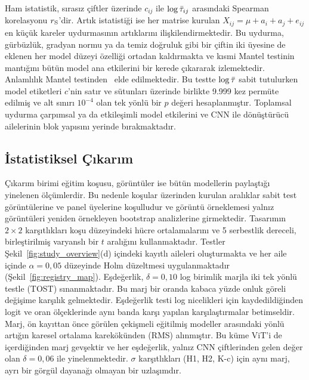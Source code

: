 Ham istatistik, sırasız çiftler üzerinde $c_{ij}$ ile $\log\bar{\tau}_{ij}$ arasındaki Spearman korelasyonu $r_{\mathrm{S}}$'dir. Artık istatistiği ise her matrise kurulan $X_{ij} = \mu + a_i + a_j + e_{ij}$ en küçük kareler uydurmasının artıklarını ilişkilendirmektedir. Bu uydurma, gürbüzlük, gradyan normu ya da temiz doğruluk gibi bir çiftin iki üyesine de eklenen her model düzeyi özelliği ortadan kaldırmakta ve kısmi Mantel testinin~\cite{smouse1986multiple} mantığını bütün model ana etkilerini bir kerede çıkararak izlemektedir. Anlamlılık Mantel testinden~\cite{mantel1967detection} elde edilmektedir. Bu testte $\log\bar{\tau}$ sabit tutulurken model etiketleri $c$'nin satır ve sütunları üzerinde birlikte 9.999 kez permüte edilmiş ve alt sınırı $10^{-4}$ olan tek yönlü bir $p$ değeri hesaplanmıştır. Toplamsal uydurma çarpımsal ya da etkileşimli model etkilerini ve CNN ile dönüştürücü ailelerinin blok yapısını yerinde bırakmaktadır.

\subsection{İstatistiksel Çıkarım}
\label{subsec:statistics}

Çıkarım birimi eğitim koşusu, görüntüler ise bütün modellerin paylaştığı yinelenen ölçümlerdir. Bu nedenle koşular üzerinden kurulan aralıklar sabit test görüntülerine ve panel üyelerine koşulludur ve görüntü örneklemesi yalnız görüntüleri yeniden örnekleyen bootstrap analizlerine girmektedir. Tasarımın $2\times2$ karşıtlıkları koşu düzeyindeki hücre ortalamalarını ve 5 serbestlik dereceli, birleştirilmiş varyanslı bir $t$ aralığını kullanmaktadır. Testler Şekil~\ref{fig:study_overview}(d) içindeki kayıtlı aileleri oluşturmakta ve her aile içinde $\alpha = 0{,}05$ düzeyinde Holm düzeltmesi uygulanmaktadır (Şekil~\ref{fig:registry_map}). Eşdeğerlik, $\delta = 0{,}10$ log birimlik marjla iki tek yönlü testle (TOST) sınanmaktadır. Bu marj bir oranda kabaca yüzde onluk göreli değişime karşılık gelmektedir. Eşdeğerlik testi log nicelikleri için kaydedildiğinden logit ve oran ölçeklerinde aynı banda karşı yapılan karşılaştırmalar betimseldir. Marj, ön kayıttan önce görülen çekişmeli eğitilmiş modeller arasındaki yönlü artığın karesel ortalama karekökünden (RMS) alınmıştır. Bu küme ViT'i de içerdiğinden marj gevşektir ve her eşdeğerlik, yalnız CNN çiftlerinden gelen değer olan $\delta = 0{,}06$ ile yinelenmektedir. $\sigma$ karşıtlıkları (H1, H2, K-c) için aynı marj, ayrı bir görgül dayanağı olmayan bir uzlaşımdır.

